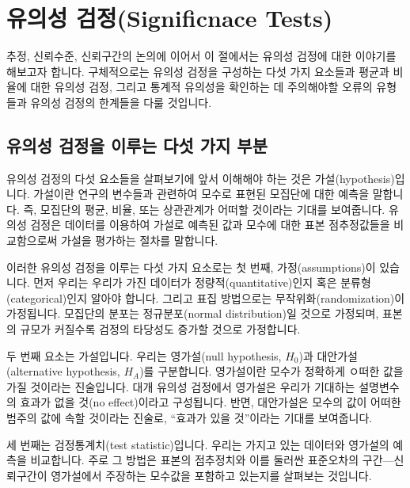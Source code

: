 \documentclass[]{book}
\begin{document}
\hypertarget{uxc720uxc758uxc131-uxac80uxc815significnace-tests}{%
\section{유의성 검정(Significnace Tests)}\label{uxc720uxc758uxc131-uxac80uxc815significnace-tests}}

추정, 신뢰수준, 신뢰구간의 논의에 이어서 이 절에서는 유의성 검정에 대한 이야기를 해보고자 합니다. 구체적으로는 유의성 검정을 구성하는 다섯 가지 요소들과 평균과 비율에 대한 유의성 검정, 그리고 통계적 유의성을 확인하는 데 주의해야할 오류의 유형들과 유의성 검정의 한계들을 다룰 것입니다.

\hypertarget{uxc720uxc758uxc131-uxac80uxc815uxc744-uxc774uxb8e8uxb294-uxb2e4uxc12f-uxac00uxc9c0-uxbd80uxbd84}{%
\subsection{유의성 검정을 이루는 다섯 가지 부분}\label{uxc720uxc758uxc131-uxac80uxc815uxc744-uxc774uxb8e8uxb294-uxb2e4uxc12f-uxac00uxc9c0-uxbd80uxbd84}}

유의성 검정의 다섯 요소들을 살펴보기에 앞서 이해해야 하는 것은 가설(hypothesis)입니다. 가설이란 연구의 변수들과 관련하여 모수로 표현된 모집단에 대한 예측을 말합니다. 즉, 모집단의 평균, 비율, 또는 상관관계가 어떠할 것이라는 기대를 보여줍니다. 유의성 검정은 데이터를 이용하여 가설로 예측된 값과 모수에 대한 표본 점추정값들을 비교함으로써 가설을 평가하는 절차를 말합니다.

이러한 유의성 검정을 이루는 다섯 가지 요소로는 첫 번째, 가정(assumptions)이 있습니다. 먼저 우리는 우리가 가진 데이터가 정량적(quantitative)인지 혹은 분류형(categorical)인지 알아야 합니다. 그리고 표집 방법으로는 무작위화(randomization)이 가정됩니다. 모집단의 분포는 정규분포(normal distribution)일 것으로 가정되며, 표본의 규모가 커질수록 검정의 타당성도 증가할 것으로 가정합니다.

두 번째 요소는 가설입니다. 우리는 영가설(null hypothesis, \(H_0\))과 대안가설(alternative hypothesis, \(H_A\))를 구분합니다. 영가설이란 모수가 정확하게 ㅇ떠한 값을 가질 것이라는 진술입니다. 대개 유의성 검정에서 영가설은 우리가 기대하는 설명변수의 효과가 없을 것(no effect)이라고 구성됩니다. 반면, 대안가설은 모수의 값이 어떠한 범주의 값에 속할 것이라는 진술로, ``효과가 있을 것''이라는 기대를 보여줍니다.

세 번째는 검정통계치(test statistic)입니다. 우리는 가지고 있는 데이터와 영가설의 예측을 비교합니다. 주로 그 방법은 표본의 점추정치와 이를 둘러싼 표준오차의 구간---신뢰구간이 영가설에서 주장하는 모수값을 포함하고 있는지를 살펴보는 것입니다.
\end{document}
